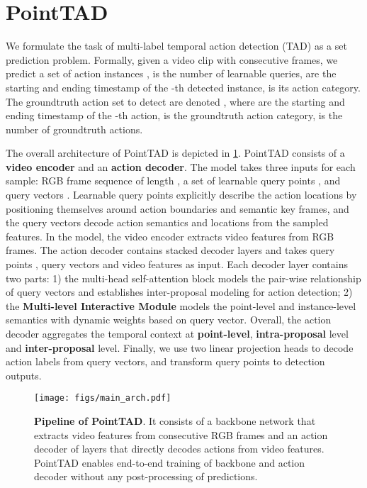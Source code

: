 \documentclass{article}
\begin{document}
\section{PointTAD}
\label{sec:method}

We formulate the task of multi-label temporal action detection (TAD) as a set prediction problem. Formally, given a video clip with  consecutive frames, we predict a set of action instances ,  is the number of learnable queries,  are the starting and ending timestamp of the -th detected instance,  is its action category. The groundtruth action set to detect are denoted , where  are the starting and ending timestamp of the -th action,  is the groundtruth action category,  is the number of groundtruth actions. 

The overall architecture of PointTAD is depicted in \cref{fig:overview}. PointTAD consists of a {\bf video encoder} and an {\bf action decoder}. The model takes three inputs for each sample: RGB frame sequence of length , a set of learnable query points , and query vectors . Learnable query points explicitly describe the action locations by positioning themselves around action boundaries and semantic key frames, and the query vectors decode action semantics and locations from the sampled features. In the model, the video encoder extracts video features  from RGB frames. The action decoder contains  stacked decoder layers and takes query points , query vectors  and video features  as input.
Each decoder layer contains two parts: 1) the {multi-head self-attention} block models the pair-wise relationship of query vectors and establishes inter-proposal modeling for action detection; 2) the {\bf Multi-level Interactive Module} models the point-level and instance-level semantics with dynamic weights based on query vector. 
Overall, the action decoder aggregates the temporal context at {\bf point-level}, {\bf intra-proposal} level and {\bf inter-proposal} level. 
Finally, we use two linear projection heads to decode action labels from query vectors, and transform query points to detection outputs.

\begin{figure}
  \centering
  \texttt{[image: figs/main\_arch.pdf]}
  \caption{{\bf Pipeline of PointTAD}. It consists of a backbone network that extracts video features from consecutive RGB frames and an action decoder of  layers that directly decodes actions from video features. 
  PointTAD enables end-to-end training of backbone and action decoder without any post-processing of predictions. }
  \label{fig:overview}
  \vspace{-4mm}
\end{figure}
\end{document}
